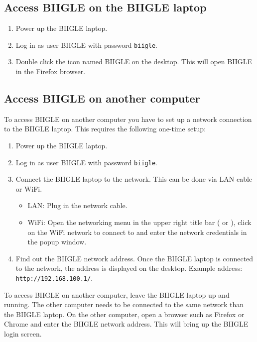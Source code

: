 



\subsection*{Access BIIGLE on the BIIGLE laptop}

\begin{enumerate}
    \item Power up the BIIGLE laptop.
    \item Log in as user BIIGLE with password \texttt{biigle}.
    \item Double click the icon named BIIGLE on the desktop. This will open BIIGLE in the Firefox browser.
\end{enumerate}

\subsection*{Access BIIGLE on another computer}

To access BIIGLE on another computer you have to set up a network connection to the BIIGLE laptop. This requires the following one-time setup:

\begin{enumerate}
    \item Power up the BIIGLE laptop.
    \item Log in as user BIIGLE with password \texttt{biigle}.
    \item Connect the BIIGLE laptop to the network. This can be done via LAN cable or WiFi. \begin{itemize}
        \item LAN: Plug in the network cable.
        \item WiFi: Open the networking menu in the upper right title bar ( or ), click on the WiFi network to connect to and enter the network credentials in the popup window.
    \end{itemize}
    \item Find out the BIIGLE network address. Once the BIIGLE laptop is connected to the network, the address is displayed on the desktop. Example address: \texttt{http://192.168.100.1/}.
\end{enumerate}

To access BIIGLE on another computer, leave the BIIGLE laptop up and running. The other computer needs to be connected to the same network than the BIIGLE laptop. On the other computer, open a browser such as Firefox or Chrome and enter the BIIGLE network address. This will bring up the BIIGLE login screen.

